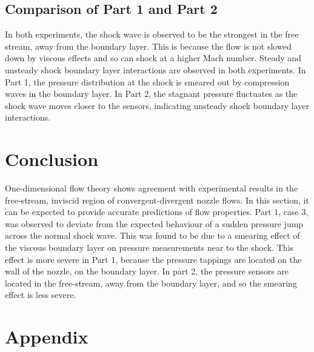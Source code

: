 \documentclass{article}
\begin{document}
\subsection{Comparison of Part 1 and Part 2}

In both experiments, the shock wave is observed to be the strongest in the free stream, away from the boundary layer.
This is because the flow is not slowed down by viscous effects and so can shock at a higher Mach number.
Steady and unsteady shock boundary layer interactions are observed in both experiments.
In Part 1, the pressure distribution at the shock is smeared out by compression waves in the boundary layer.
In Part 2, the stagnant pressure fluctuates as the shock wave moves closer to the sensors, indicating unsteady shock boundary layer interactions.


\section{Conclusion}

One-dimensional flow theory shows agreement with experimental results in the free-stream, inviscid region of convergent-divergent nozzle flows.
In this section, it can be expected to provide accurate predictions of flow properties. 
Part 1, case 3, was observed to deviate from the expected behaviour of a sudden pressure jump across the normal shock wave.
This was found to be due to a smearing effect of the viscous boundary layer on pressure measurements near to the shock.
This effect is more severe in Part 1, because the pressure tappings are located on the wall of the nozzle, on the boundary layer.
In part 2, the pressure sensors are located in the free-stream, away from the boundary layer, and so the smearing effect is less severe.


\iftrue

\newpage
\section{Appendix}
\end{document}
